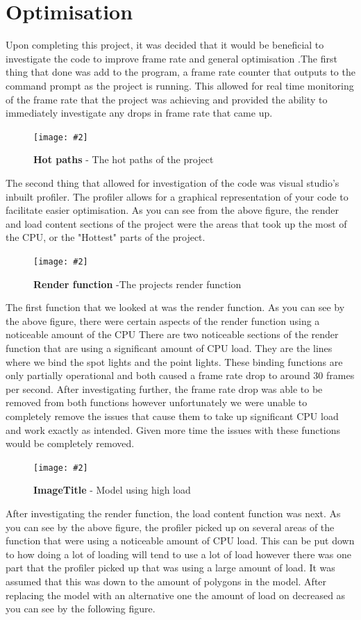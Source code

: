 \documentclass[10pt, a4paper]{article}
\newcommand{\figuremacro}[5]{
    \begin{figure}[#1]
        \centering
        \texttt{[image: \#2]}
        \caption[#3]{\textbf{#3}#4}
        \label{fig:#2}
    \end{figure}
}
\begin{document}
\section{Optimisation}
Upon completing this project, it was decided that it would be beneficial to investigate the code to improve frame rate and general optimisation .The first thing that done was add to the program, a frame rate counter that outputs to the command prompt as the project is running. This allowed for real time monitoring of the frame rate that the project was achieving and provided the ability to immediately investigate any drops in frame rate that came up.

\figuremacro{h}{hotpath.jpg}{Hot paths}{ - The hot paths of the project}{1.0}

The second thing that allowed for investigation of the code was visual studio's inbuilt profiler. The profiler allows for a graphical representation of your code to facilitate easier optimisation.
As you can see from the above figure, the render and load content sections of the project were the areas that took up the most of the CPU, or the "Hottest" parts of the project. 

\figuremacro{h}{render.jpg}{Render function}{ -The projects render function}{1.0}

The first function that we looked at was the render function. As you can see by the above figure, there were certain aspects of the render function using a noticeable amount of the CPU
There are two noticeable sections of the render function that are using a significant amount of CPU load. They are the lines where we bind the spot lights and the point lights. These binding functions are only partially operational and both caused a frame rate drop to around 30 frames per second. After investigating further, the frame rate drop was able to be removed from both functions however unfortunately we were unable to completely remove the issues that cause them to take up significant CPU load and work exactly as  intended. Given more time the issues with these functions would be completely removed.
\figuremacro{h}{loadcontent.png}{ImageTitle}{ - Model using high load}{1.0}

After investigating the render function, the load content function was next. As you can see by the above figure, the profiler picked up on several areas of the function that were using a noticeable amount of CPU load. This can be put down to how doing a lot of loading will tend to use a lot of load however there was one part that the profiler picked up that was using a large amount of load. It was assumed that this was down to the amount of polygons in the model. After replacing the model with an alternative one the amount of load on decreased as you can see by the following figure.
\end{document}
